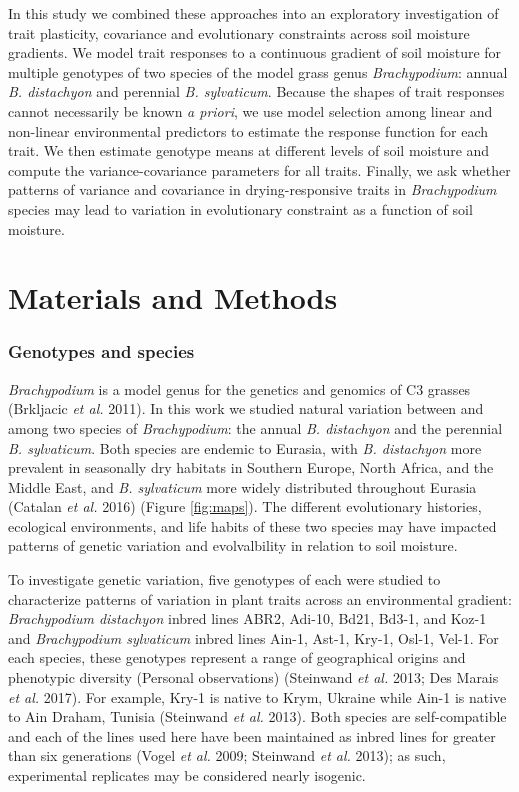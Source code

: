 \documentclass[jou,floatsintext]{apa6}
\begin{document}
In this study we combined these approaches into an exploratory investigation of trait plasticity, covariance and evolutionary constraints across soil moisture gradients. We model trait responses to a continuous gradient of soil moisture for multiple genotypes of two species of the model grass genus \emph{Brachypodium}: annual \emph{B. distachyon} and perennial \emph{B. sylvaticum}. Because the shapes of trait responses cannot necessarily be known \emph{a priori}, we use model selection among linear and non-linear environmental predictors to estimate the response function for each trait. We then estimate genotype means at different levels of soil moisture and compute the variance-covariance parameters for all traits. Finally, we ask whether patterns of variance and covariance in drying-responsive traits in \emph{Brachypodium} species may lead to variation in evolutionary constraint as a function of soil moisture.

\hypertarget{materials-and-methods}{%
\section{Materials and Methods}\label{materials-and-methods}}

\hypertarget{genotypes-and-species}{%
\subsubsection{Genotypes and species}\label{genotypes-and-species}}

\emph{Brachypodium} is a model genus for the genetics and genomics of C3 grasses (Brkljacic \emph{et al.} 2011). In this work we studied natural variation between and among two species of \emph{Brachypodium}: the annual \emph{B. distachyon} and the perennial \emph{B. sylvaticum}. Both species are endemic to Eurasia, with \emph{B. distachyon} more prevalent in seasonally dry habitats in Southern Europe, North Africa, and the Middle East, and \emph{B. sylvaticum} more widely distributed throughout Eurasia (Catalan \emph{et al.} 2016) (Figure \ref{fig:maps}). The different evolutionary histories, ecological environments, and life habits of these two species may have impacted patterns of genetic variation and evolvalbility in relation to soil moisture.

To investigate genetic variation, five genotypes of each were studied to characterize patterns of variation in plant traits across an environmental gradient: \emph{Brachypodium distachyon} inbred lines ABR2, Adi-10, Bd21, Bd3-1, and Koz-1 and \emph{Brachypodium sylvaticum} inbred lines Ain-1, Ast-1, Kry-1, Osl-1, Vel-1. For each species, these genotypes represent a range of geographical origins and phenotypic diversity (Personal observations) (Steinwand \emph{et al.} 2013; Des Marais \emph{et al.} 2017). For example, Kry-1 is native to Krym, Ukraine while Ain-1 is native to Ain Draham, Tunisia (Steinwand \emph{et al.} 2013). Both species are self-compatible and each of the lines used here have been maintained as inbred lines for greater than six generations (Vogel \emph{et al.} 2009; Steinwand \emph{et al.} 2013); as such, experimental replicates may be considered nearly isogenic.
\end{document}
